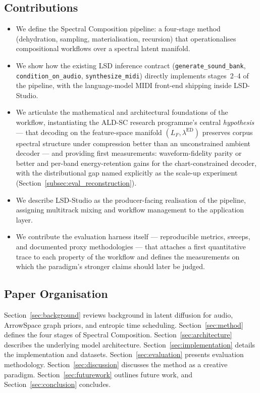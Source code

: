 \documentclass[12pt,a4paper]{article}
\begin{document}
\subsection{Contributions}

\begin{itemize}[leftmargin=*]
  \item We define the Spectral Composition pipeline: a four-stage method
    (dehydration, sampling, materialisation, recursion) that operationalises
    compositional workflows over a spectral latent manifold.
  \item We show how the existing LSD inference contract
    (\texttt{generate\_sound\_bank}, \texttt{condition\_on\_audio},
    \texttt{synthesize\_midi}) directly implements stages~2--4 of the
    pipeline, with the language-model MIDI front-end shipping inside
    LSD-Studio.
  \item We articulate the mathematical and architectural foundations of
    the workflow, instantiating the ALD-SC research programme's central
    \emph{hypothesis} --- that decoding on the feature-space manifold
    $(L_F, \lambda^{\mathrm{ED}})$ preserves corpus spectral structure
    under compression better than an unconstrained ambient decoder ---
    and providing first measurements: waveform-fidelity parity or better
    and per-band energy-retention gains for the chart-constrained
    decoder, with the distributional gap named explicitly as the
    scale-up experiment (Section~\ref{subsec:eval_reconstruction}).
  \item We describe LSD-Studio as the producer-facing realisation of the
    pipeline, assigning multitrack mixing and workflow management to the
    application layer.
  \item We contribute the evaluation harness itself --- reproducible
    metrics, sweeps, and documented proxy methodologies --- that attaches
    a first quantitative trace to each property of the workflow and
    defines the measurements on which the paradigm's stronger claims
    should later be judged.
\end{itemize}

\subsection{Paper Organisation}

Section~\ref{sec:background} reviews background in latent diffusion for
audio, ArrowSpace graph priors, and entropic time scheduling.
Section~\ref{sec:method} defines the four stages of Spectral Composition.
Section~\ref{sec:architecture} describes the underlying model architecture.
Section~\ref{sec:implementation} details the implementation and datasets.
Section~\ref{sec:evaluation} presents evaluation methodology.
Section~\ref{sec:discussion} discusses the method as a creative paradigm.
Section~\ref{sec:futurework} outlines future work, and
Section~\ref{sec:conclusion} concludes.
\end{document}
